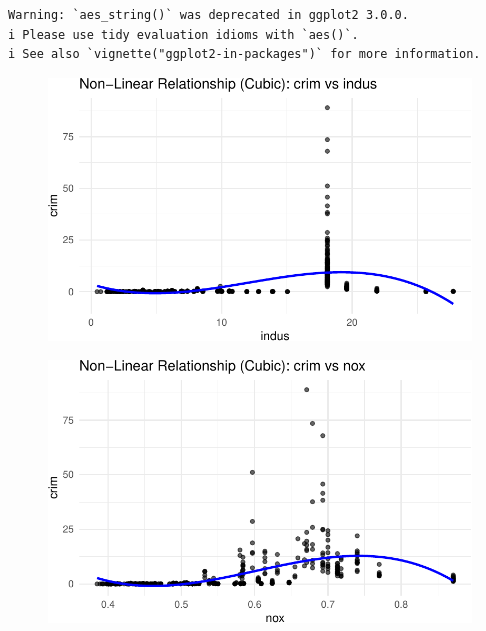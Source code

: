 \documentclass[
]{article}
\begin{document}
\begin{verbatim}
Warning: `aes_string()` was deprecated in ggplot2 3.0.0.
i Please use tidy evaluation idioms with `aes()`.
i See also `vignette("ggplot2-in-packages")` for more information.
\end{verbatim}

\begin{figure}[H]

{\centering \includegraphics{hw1_files/figure-pdf/unnamed-chunk-20-1.pdf}

}

\end{figure}

\begin{figure}[H]

{\centering \includegraphics{hw1_files/figure-pdf/unnamed-chunk-20-2.pdf}

}

\end{figure}
\end{document}
